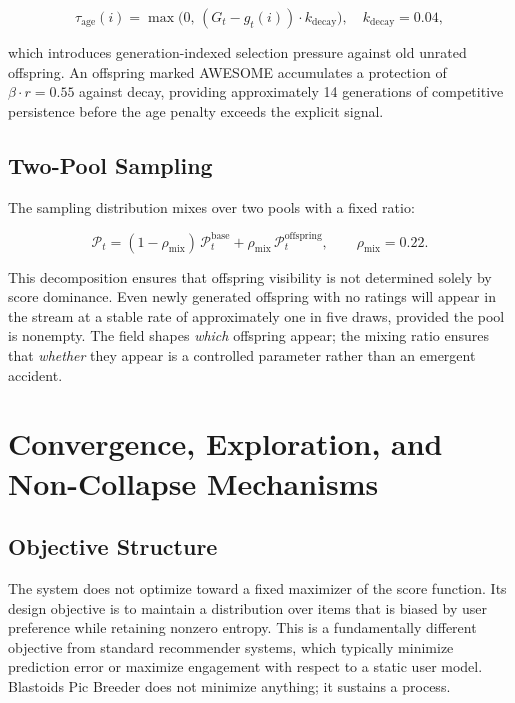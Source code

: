 \documentclass[12pt, a4paper]{article}
\theoremstyle{definition}
\begin{document}
\begin{equation}
\tau_{\mathrm{age}}(i) = \max\!\bigl(0,\,(G_t - g_t(i))\cdot k_{\mathrm{decay}}\bigr), \quad k_{\mathrm{decay}} = 0.04,
\end{equation}

which introduces generation-indexed selection pressure against old unrated offspring. An offspring marked AWESOME accumulates a protection of $\beta \cdot r = 0.55$ against decay, providing approximately 14 generations of competitive persistence before the age penalty exceeds the explicit signal.

\subsection{Two-Pool Sampling}

The sampling distribution mixes over two pools with a fixed ratio:

\begin{equation}
\mathcal{P}_t = (1 - \rho_{\mathrm{mix}})\,\mathcal{P}_t^{\mathrm{base}} + \rho_{\mathrm{mix}}\,\mathcal{P}_t^{\mathrm{offspring}}, \qquad \rho_{\mathrm{mix}} = 0.22.
\end{equation}

This decomposition ensures that offspring visibility is not determined solely by score dominance. Even newly generated offspring with no ratings will appear in the stream at a stable rate of approximately one in five draws, provided the pool is nonempty. The field shapes \textit{which} offspring appear; the mixing ratio ensures that \textit{whether} they appear is a controlled parameter rather than an emergent accident.

\section{Convergence, Exploration, and Non-Collapse Mechanisms}

\subsection{Objective Structure}

The system does not optimize toward a fixed maximizer of the score function. Its design objective is to maintain a distribution over items that is biased by user preference while retaining nonzero entropy. This is a fundamentally different objective from standard recommender systems, which typically minimize prediction error or maximize engagement with respect to a static user model. Blastoids Pic Breeder does not minimize anything; it sustains a process.
\end{document}

